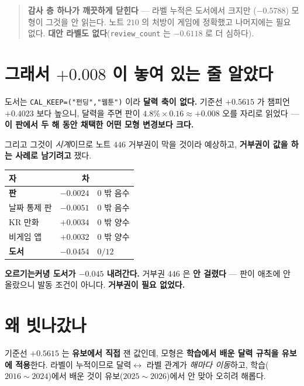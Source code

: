 \documentclass[11pt]{article}
\begin{document}
\begin{quote}
\textbf{감사 층 하나가 깨끗하게 닫힌다} --- 라벨 누적은 도서에서 크지만
($-0.5788$) 모형이 그것을 안 읽는다. 노트 $210$ 의 처방이 게임에 정확했고
나머지에는 필요 없다. \textbf{대안 라벨도 없다}(\texttt{review\_count} 는
$-0.6118$ 로 더 심하다).
\end{quote}

\section{그래서 $+0.008$ 이 놓여 있는 줄 알았다}

도서는 \texttt{CAL\_KEEP=("펀딩","웹툰")} 이라 \textbf{달력 축이 없다.}
기준선 $+0.5615$ 가 챔피언 $+0.4023$ 보다 높으니, 달력을 주면 판이
$4.8\% \times 0.16 \approx \mathbf{+0.008}$ 오를 자리로 읽었다 ---
\textbf{이 판에서 두 해 동안 채택한 어떤 모형 변경보다 크다.}

그리고 그것이 \emph{시계}이므로 노트 $446$ 거부권이 막을 것이라 예상하고,
\textbf{거부권이 값을 하는 사례로 남기려고} 쟀다.

\begin{center}
\begin{tabular}{lrl}
\hline
자 & 차 & \\
\hline
\textbf{판} & $\mathbf{-0.0024}$ & $0$ 밖 음수 \\
날짜 통제 판 & $-0.0051$ & $0$ 밖 음수 \\
KR 만화 & $+0.0034$ & $0$ 밖 양수 \\
비게임 앱 & $+0.0032$ & $0$ 밖 양수 \\
\textbf{도서} & $\mathbf{-0.0454}$ & $0/12$ \\
\hline
\end{tabular}
\end{center}

\textbf{오르기는커녕 도서가 $-0.045$ 내려간다.} 거부권 $446$ 은
\textbf{안 걸렸다} --- 판이 애초에 안 올랐으니 발동 조건이 아니다.
\textbf{거부권이 필요 없었다.}

\section{왜 빗나갔나}

기준선 $+0.5615$ 는 \textbf{유보에서 직접} 잰 값인데, 모형은 \textbf{학습에서
배운 달력 규칙을 유보에 적용}한다. 라벨이 누적이므로 달력$\leftrightarrow$
라벨 관계가 \emph{해마다 이동}하고, 학습($2016\!\sim\!2024$)에서 배운 것이
유보($2025\!\sim\!2026$)에서 안 맞아 오히려 해롭다.
\end{document}
